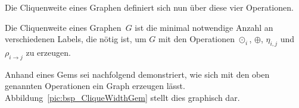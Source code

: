 %
%
%


Die Cliquenweite eines Graphen definiert sich nun über diese vier Operationen.

\begin{mydef}
    Die Cliquenweite eines Graphen~$G$ ist die minimal notwendige Anzahl an verschiedenen Labels, die nötig ist, um $G$ mit den Operationen $\odot_i$, $\oplus$, $\eta_{i,j}$ und $\rho_{i \rightarrow j}$ zu erzeugen.
\end{mydef}

Anhand eines Gems sei nachfolgend demonstriert, wie sich mit den oben genannten Operationen ein Graph erzeugen lässt. Abbildung~\ref{pic:bsp_CliqueWidthGem} stellt dies graphisch dar.


